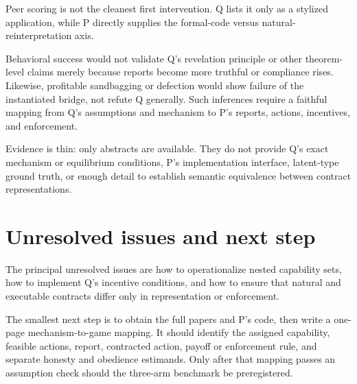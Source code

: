 \documentclass{article}
\begin{document}
Peer scoring is not the cleanest first intervention. Q lists it only as a stylized application, while P directly supplies the formal-code versus natural-reinterpretation axis.

Behavioral success would not validate Q's revelation principle or other theorem-level claims merely because reports become more truthful or compliance rises. Likewise, profitable sandbagging or defection would show failure of the instantiated bridge, not refute Q generally. Such inferences require a faithful mapping from Q's assumptions and mechanism to P's reports, actions, incentives, and enforcement.

Evidence is thin: only abstracts are available. They do not provide Q's exact mechanism or equilibrium conditions, P's implementation interface, latent-type ground truth, or enough detail to establish semantic equivalence between contract representations.

\section{Unresolved issues and next step}

The principal unresolved issues are how to operationalize nested capability sets, how to implement Q's incentive conditions, and how to ensure that natural and executable contracts differ only in representation or enforcement.

The smallest next step is to obtain the full papers and P's code, then write a one-page mechanism-to-game mapping. It should identify the assigned capability, feasible actions, report, contracted action, payoff or enforcement rule, and separate honesty and obedience estimands. Only after that mapping passes an assumption check should the three-arm benchmark be preregistered.
\end{document}
